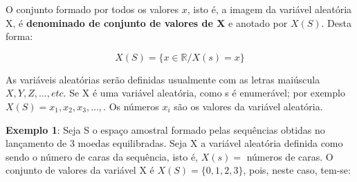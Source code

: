 \par O conjunto formado por todos os valores $x$, isto é, a imagem
da variável aleatória X, é \textbf{denominado de conjunto de
valores de X} e anotado por $X(S)$. Desta forma:

\begin{equation}
    X(S) = \{ x \in \mathbb{R}/X(s)=x  \}
\end{equation}




As variáveis aleatórias serão definidas usualmente com as letras
maiúscula $X, Y, Z, \ldots, etc$. Se X é uma variável aleatória,
como s é enumerável; por exemplo
$X(S)={x_{1},x_{2},x_{3},\ldots,}$. Os números $x_{i}$ são os
valores da variável aleatória.\vskip0.3cm




\newpage
\textbf{Exemplo 1}: Seja S o espaço amostral formado pelas
sequências obtidas no lançamento de 3 moedas equilibradas. Seja X
a variável aleatória definida como sendo o número de caras da
sequência, isto é, $X(s)=$ números de caras. O conjunto de
valores da variável X é $X(S)=\{0,1,2,3\}$, pois, neste caso,
tem-se:

\begin{table}[!htb]
\end{table}



